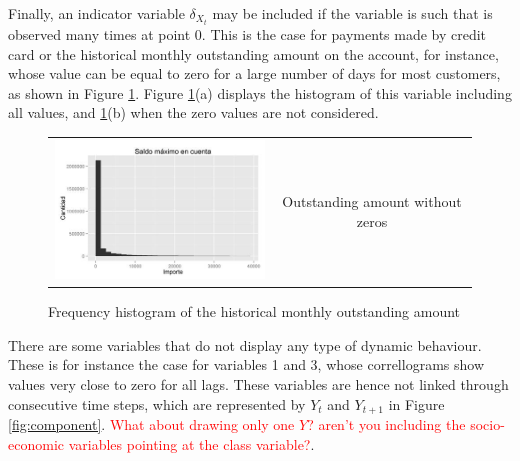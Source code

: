 Finally, an indicator variable $\delta_{X_t}$ may be included if the variable is such that is observed many times at point 0. This is the case for payments made by credit card or the historical monthly outstanding amount on the account, for instance, whose value can be equal to zero for a large number of days for most customers, as shown in Figure \ref{fig:CajamarIndicatorVar}. Figure \ref{fig:CajamarIndicatorVar}(a) displays the histogram of this variable including all values, and \ref{fig:CajamarIndicatorVar}(b) when the zero values are not considered.

\begin{figure}
  \centering
    \begin{tabular}{cc}
    \includegraphics[width=70mm]{figures/CajaMarOutsAmount}&
    \begin{minipage}[b]{0.45\linewidth} Outstanding amount without zeros\end{minipage}\\
  \end{tabular}
    \caption{\label{fig:CajamarIndicatorVar}Frequency histogram of the historical monthly outstanding amount}
\end{figure}

There are some variables that do not display any type of dynamic behaviour. These is for instance the case for variables 1 and 3, whose correllograms show values very close to zero for all lags. These variables are hence not linked through consecutive time steps, which are represented by $Y_{t}$ and $Y_{t+1}$ in Figure \ref{fig:component}. \textcolor{red}{What about drawing only one $Y$? aren't you including the socio-economic variables pointing at the class variable?}. 

